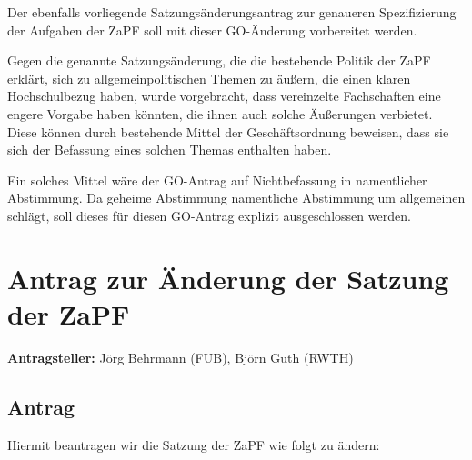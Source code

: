 \documentclass[draft,10pt,oneside]{scrartcl}
\begin{document}
Der ebenfalls vorliegende Satzungsänderungsantrag zur genaueren Spezifizierung
der Aufgaben der ZaPF soll mit dieser GO-Änderung vorbereitet werden.

Gegen die genannte Satzungsänderung, die die bestehende Politik der ZaPF
erklärt, sich zu allgemeinpolitischen Themen zu äußern, die einen klaren
Hochschulbezug haben, wurde vorgebracht, dass vereinzelte Fachschaften eine
engere Vorgabe haben könnten, die ihnen auch solche Äußerungen verbietet. Diese
können durch bestehende Mittel der Geschäftsordnung beweisen, dass sie sich der
Befassung eines solchen Themas enthalten haben.

Ein solches Mittel wäre der GO-Antrag auf Nichtbefassung in namentlicher
Abstimmung. Da geheime Abstimmung namentliche Abstimmung um allgemeinen schlägt,
soll dieses für diesen GO-Antrag explizit ausgeschlossen werden.

\newpage

\section*{Antrag zur Änderung der Satzung der ZaPF}

\textbf{Antragsteller:} Jörg Behrmann (FUB), Björn Guth (RWTH)

\subsection*{Antrag}

Hiermit beantragen wir die Satzung der ZaPF wie folgt zu ändern:
\end{document}
